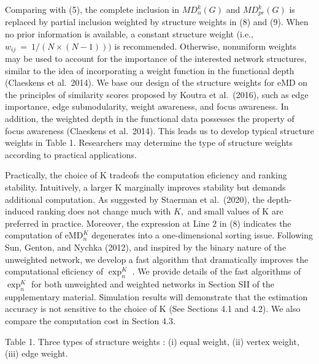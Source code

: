\documentclass[
  10
]{article}
\begin{document}
Comparing with (5), the complete inclusion in
\(M D _ { n } ^ { k } ( G )\) and \(M D _ { p r } ^ { k } ( G )\) is
replaced by partial inclusion weighted by structure weights in (8) and
(9). When no prior information is available, a constant structure weight
(i.e., \(w _ { i j } ~ = ~ 1 / ( N \times ( N - 1 ) ) )\) is
recommended. Otherwise, nonuniform weights may be used to account for
the importance of the interested network structures, similar to the idea
of incorporating a weight function in the functional depth (Claeskens et
al.~2014). We base our design of the structure weights for eMD on the
principles of similarity scores proposed by Koutra et al.~(2016), such
as edge importance, edge submodularity, weight awareness, and focus
awareness. In addition, the weighted depth in the functional data
possesses the property of focus awareness (Claeskens et al.~2014). This
leads us to develop typical structure weights in Table 1. Researchers
may determine the type of structure weights according to practical
applications.

Practically, the choice of K tradeofs the computation eficiency and
ranking stability. Intuitively, a larger K marginally improves stability
but demands additional computation. As suggested by Staerman et
al.~(2020), the depth-induced ranking does not change much with \(K ,\)
and small values of K are preferred in practice. Moreover, the
expression at Line 2 in (8) indicates the computation of
\(\mathrm { e M D } _ { n } ^ { K }\) degenerates into a one-dimensional
sorting issue. Following Sun, Genton, and Nychka (2012), and inspired by
the binary nature of the unweighted network, we develop a fast algorithm
that dramatically improves the computational eficiency of
\(\exp _ { n } ^ { K }\) . We provide details of the fast algorithms of
\(\exp _ { n } ^ { K }\) for both unweighted and weighted networks in
Section SII of the supplementary material. Simulation results will
demonstrate that the estimation accuracy is not sensitive to the choice
of K (See Sections 4.1 and 4.2). We also compare the computation cost in
Section 4.3.

Table 1. Three types of structure weights : (i) equal weight, (ii)
vertex weight, (iii) edge weight.
\end{document}
